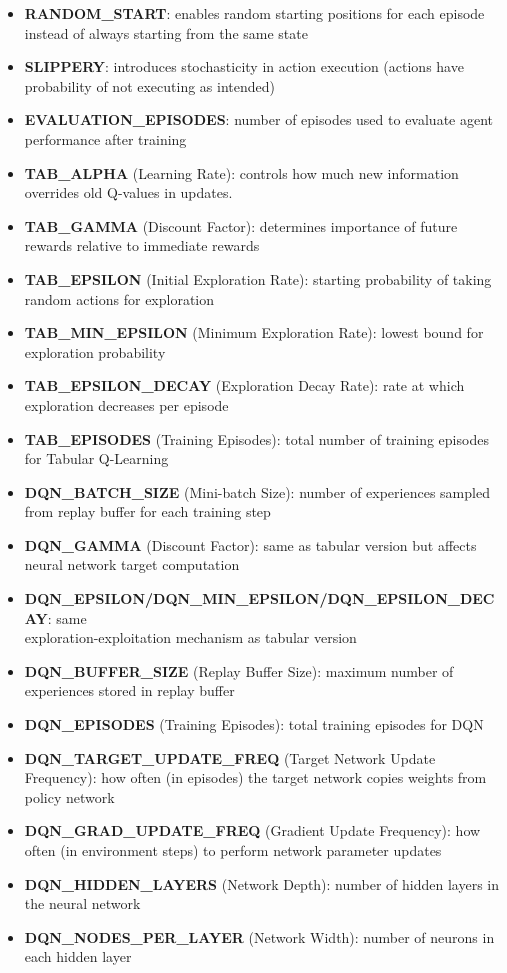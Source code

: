 \documentclass[a4paper,12pt]{article}
\begin{document}
\begin{itemize}
    \item \textbf{RANDOM\_START}: enables random starting positions for each episode instead of always starting from the same state
    \item \textbf{SLIPPERY}: introduces stochasticity in action execution (actions have probability of not executing as intended)
    \item \textbf{EVALUATION\_EPISODES}: number of episodes used to evaluate agent performance after training
    \item \textbf{TAB\_ALPHA} (Learning Rate): controls how much new information overrides old Q-values in updates.
    \item \textbf{TAB\_GAMMA} (Discount Factor): determines importance of future rewards relative to immediate rewards
    \item \textbf{TAB\_EPSILON} (Initial Exploration Rate): starting probability of taking random actions for exploration
    \item \textbf{TAB\_MIN\_EPSILON} (Minimum Exploration Rate): lowest bound for exploration probability
    \item \textbf{TAB\_EPSILON\_DECAY} (Exploration Decay Rate): rate at which exploration decreases per episode
    \item \textbf{TAB\_EPISODES} (Training Episodes): total number of training episodes for Tabular Q-Learning
    \item \textbf{DQN\_BATCH\_SIZE} (Mini-batch Size): number of experiences sampled from replay buffer for each training step
    \item \textbf{DQN\_GAMMA} (Discount Factor): same as tabular version but affects neural network target computation
    \item \textbf{DQN\_EPSILON/DQN\_MIN\_EPSILON/DQN\_EPSILON\_DECAY}: same\\ exploration-exploitation mechanism as tabular version
    \item \textbf{DQN\_BUFFER\_SIZE} (Replay Buffer Size): maximum number of experiences stored in replay buffer
    \item \textbf{DQN\_EPISODES} (Training Episodes): total training episodes for DQN
    \item \textbf{DQN\_TARGET\_UPDATE\_FREQ} (Target Network Update Frequency): how often (in episodes) the target network copies weights from policy network
    \item \textbf{DQN\_GRAD\_UPDATE\_FREQ} (Gradient Update Frequency): how often (in environment steps) to perform network parameter updates
    \item \textbf{DQN\_HIDDEN\_LAYERS} (Network Depth): number of hidden layers in the neural network
    \item \textbf{DQN\_NODES\_PER\_LAYER} (Network Width): number of neurons in each hidden layer
\end{itemize}
\end{document}
